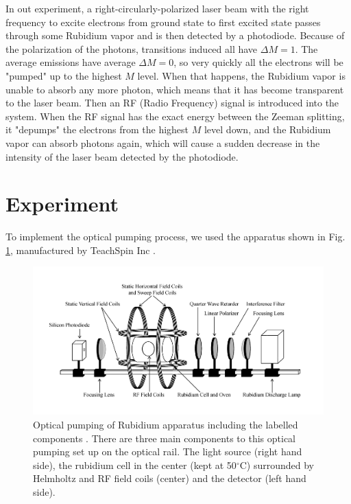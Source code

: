 \documentclass[prb,preprint]{revtex4-1}
\begin{document}
In out experiment, a right-circularly-polarized laser beam with the right frequency to excite electrons from ground state to first excited state passes through some Rubidium vapor and is then detected by a photodiode. Because of the polarization of the photons, transitions induced all have $\Delta M=1$. The average emissions have average $\Delta M=0$, so very quickly all the electrons will be "pumped" up to the highest $M$ level. When that happens, the Rubidium vapor is unable to absorb any more photon, which means that it has become transparent to the laser beam. Then an RF (Radio Frequency) signal is introduced into the system. When the RF signal has the exact energy between the Zeeman splitting, it "depumps" the electrons from the highest $M$ level down, and the Rubidium vapor can absorb photons again, which will cause a sudden decrease in the intensity of the laser beam detected by the photodiode. \\

\section{Experiment}

To implement the optical pumping process, we used the apparatus shown in Fig. 
\ref{exp}, manufactured by TeachSpin Inc \cite{teach}. \\

\begin{figure}[h]
\centering
\includegraphics[width=16cm]{exp.jpg}
\caption{Optical pumping of Rubidium apparatus including the labelled components \cite{rib}. There are three main components to this optical pumping set up on the optical rail. The light source (right hand side), the rubidium cell in the center (kept at 50$^{\circ}$C) surrounded by Helmholtz and RF field coils (center) and the detector (left hand side). }
\label{exp}
\end{figure}
\end{document}

